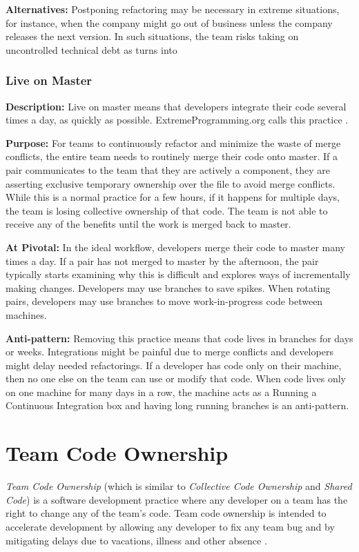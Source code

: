 \textbf{Alternatives:} Postponing refactoring may be necessary in extreme situations, for instance, when the company might go out of business unless the company releases the next version. In such situations, the team risks taking on uncontrolled technical debt as  turns into  

\subsubsection{Live on Master}
\textbf{Description:} Live on master means that developers integrate their code several times a day, as quickly as possible. ExtremeProgramming.org calls this practice  \cite{WellsIntegrateOften}.

\textbf{Purpose:} For teams to continuously refactor and minimize the waste of merge conflicts, the entire team needs to routinely merge their code onto master. If a pair communicates to the team that they are actively  a component, they are asserting exclusive temporary ownership over the file to avoid merge conflicts. While this is a normal practice for a few hours, if it happens for multiple days, the team is losing collective ownership of that code. The team is not able to receive any of the benefits until the work is merged back to master. 

\textbf{At Pivotal:} In the ideal workflow, developers merge their code to master many times a day. If a pair has not merged to master by the afternoon, the pair typically starts examining why this is difficult and explores ways of incrementally making changes. Developers may use branches to save spikes. When rotating pairs, developers may use branches to move work-in-progress code between machines. 

\textbf{Anti-pattern:} Removing this practice means that code lives in branches for days or weeks. Integrations might be painful due to merge conflicts and developers might delay needed refactorings. If a developer has code only on their machine, then no one else on the team can use or modify that code. When code lives only on one machine for many days in a row, the machine acts as a  Running a Continuous Integration box and having long running branches is an anti-pattern.

\section{Team Code Ownership}
\textit{Team Code Ownership} (which is similar to \textit{Collective Code Ownership} and \textit{Shared Code}) is a software development practice where any developer on a team has the right to change any of the team’s code. Team code ownership is intended to accelerate development by allowing any developer to fix any team bug and by mitigating delays due to vacations, illness and other absence \cite{BeckExtremeProgramming2004}.
 
